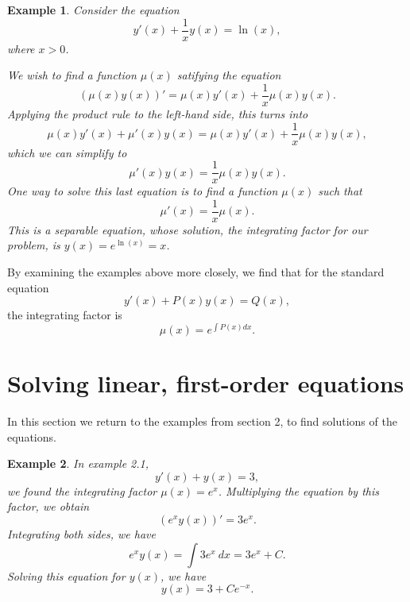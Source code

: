 \documentclass[11pt]{amsart}
\newtheorem{example}{Example}[section]
\numberwithin{equation}{section}
\begin{document}
\begin{example}
Consider the equation
\begin{equation}
\label{example5}
y'(x)+\frac{1}{x}y(x)=\ln(x),
\end{equation}
where $x>0$. 

We wish to find a function $\mu(x)$ satifying the equation
\begin{equation*}
(\mu(x) y(x))'= \mu(x)y'(x)+\frac{1}{x}\mu(x)y(x).
\end{equation*}
Applying the product rule to the left-hand side, this turns into
\begin{equation*}
\mu(x)y'(x)+\mu'(x)y(x)= \mu(x)y'(x) + \frac{1}{x}\mu(x)y(x),
\end{equation*}
which we can simplify to 
\begin{equation*}
\mu'(x)y(x)=\frac{1}{x}\mu(x)y(x).
\end{equation*}
One way to solve this last equation is to find a function $\mu(x)$ such that 
\begin{equation*}
\mu'(x)=\frac{1}{x}\mu(x).
\end{equation*}
This is a separable equation, whose solution, the integrating factor for our problem, is $y(x)=e^{\ln(x)}=x$.
\end{example}

By examining the examples above more closely, we find that for the standard equation
\begin{equation*}
y'(x)+P(x)y(x)=Q(x), 
\end{equation*}
the integrating factor is 
\begin{equation}
\label{integrating_factor}
\mu(x)=e^{\int P(x)dx}.
\end{equation}

\section{Solving linear, first-order equations}
In this section we return to the examples from section 2, to find solutions of the equations. 

\begin{example}
In example 2.1, 
\begin{equation*}
y'(x)+y(x)=3,
\end{equation*}
we found the integrating factor $\mu(x)=e^x$. Multiplying the equation by this factor, we obtain
\begin{equation*}
(e^xy(x))' = 3e^x.
\end{equation*}
Integrating both sides, we have 
\begin{equation}
\label{example1_integrated}
e^xy(x) = \int 3e^x \ dx = 3e^x + C.
\end{equation}
Solving this equation for $y(x)$, we have 
\begin{equation*}
y(x) = 3 + Ce^{-x}.
\end{equation*}
\end{example}
\end{document}
